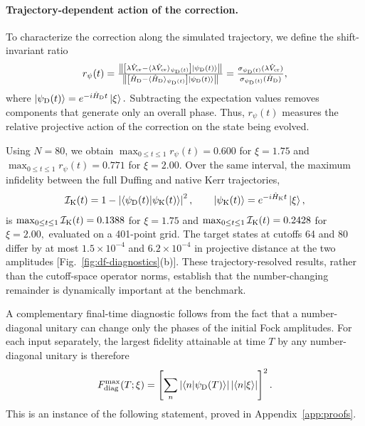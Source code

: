 \documentclass[pra,twocolumn,superscriptaddress,nofootinbib,floatfix]{revtex4-2}
\theoremstyle{remark}
\newcommand{\revcolor}{\color{blue}}
\DeclareRobustCommand{\rev}[1]{{\revcolor #1}}
\begin{document}
\paragraph{Trajectory-dependent action of the correction.}
To characterize the correction along the simulated trajectory, we define the shift-invariant ratio
\begin{align}
r_\psi(t)=\tfrac{\left\|\left[\lambda\hat V_{\rm cr}-\langle\lambda\hat V_{\rm cr}\rangle_{\psi_{\rm D}(t)}\right]\ket{\psi_{\rm D}(t)}\right\|}{\left\|\left[\hat H_{\rm D}-\langle\hat H_{\rm D}\rangle_{\psi_{\rm D}(t)}\right]\ket{\psi_{\rm D}(t)}\right\|}=\tfrac{\sigma_{\psi_{\rm D}(t)}(\lambda\hat V_{\rm cr})}{\sigma_{\psi_{\rm D}(t)}(\hat H_{\rm D})},
\label{eq:df-state-ratio}
\end{align}
where \(\ket{\psi_{\rm D}(t)}=e^{-i\hat H_{\rm D}t}\ket{\xi}.\) Subtracting the expectation values removes components that generate only an overall phase. Thus, \(r_\psi(t)\) measures the relative projective action of the correction on the state being evolved.

Using \(N=80\), we obtain $\max_{0\leq t\leq1}r_\psi(t)=0.600$ for $\xi=1.75$ and $\max_{0\leq t\leq1}r_\psi(t)=0.771$ for $\xi=2.00.$ Over the same interval, the maximum infidelity between the full Duffing and native Kerr trajectories,
\begin{align}
\mathcal I_{\rm K}(t)=1-\left|\braket{\psi_{\rm D}(t)}{\psi_{\rm K}(t)}\right|^2,\qquad\ket{\psi_{\rm K}(t)}=e^{-i\hat H_{\rm K}t}\ket{\xi},
\label{eq:df-native-infidelity}
\end{align}
\rev{is \(\max_{0\leq t\leq1}\mathcal I_{\rm K}(t)=0.1388\) for $\xi=1.75$ and $\max_{0\leq t\leq1}\mathcal I_{\rm K}(t)=0.2428$ for $\xi=2.00,$ evaluated on a 401-point grid.} \rev{The target states at cutoffs 64 and 80 differ by at most \(1.5\times10^{-4}\) and \(6.2\times10^{-4}\) in projective distance at the two amplitudes [Fig.~\ref{fig:df-diagnostics}(b)].} These trajectory-resolved results, rather than the cutoff-space operator norms, establish that the number-changing remainder is dynamically important at the benchmark.

A complementary final-time diagnostic follows from the fact that a number-diagonal unitary can change only the phases of the initial Fock amplitudes. For each input separately, the largest fidelity attainable at time \(T\) by any number-diagonal unitary is therefore
\begin{align}
F_{\rm diag}^{\max}(T;\xi)=\left[\sum_n\left|\braket{n}{\psi_{\rm D}(T)}\right|\left|\braket{n}{\xi}\right|\right]^2 .
\label{eq:df-diagonal-ceiling}
\end{align}
\rev{This is an instance of the following statement, proved in Appendix~\ref{app:proofs}.}
\end{document}

